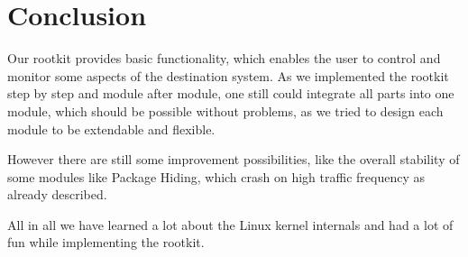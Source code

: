 \chapter{Conclusion}
Our rootkit provides basic functionality, which enables the user to control and 
monitor some aspects of the destination system. As we implemented the rootkit 
step by step and module after module, one still could integrate all parts into 
one module, which should be possible without problems, as we tried to design 
each module to be extendable and flexible.\par
However there are still some improvement possibilities, like the overall 
stability of some modules like Package Hiding, which crash on high traffic 
frequency as already described.\par
All in all we have learned a lot about the Linux kernel internals and had a lot 
of fun while implementing the rootkit.

